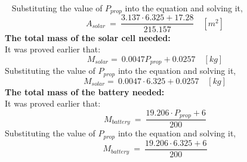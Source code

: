 \  \quad [m^2] \] Substituting the value of $ P_{prop} $ into the equation and solving it, \[ A_{solar} \ = \ \frac{ 3.137 \cdot 6.325 + 17.28 }{ 215.157 } \quad [m^2] \] \boxfour \vspace{1cm} \p \textbf{The total mass of the solar cell needed:} \vspace{0.1cm}\\ It was proved earlier that: \[ M_{solar} = \ 0.0047 P_{prop} + 0.0257  \quad [kg] \] Substituting the value of $ P_{prop} $ into the equation and solving it, \[ M_{solar} = \ 0.0047 \cdot 6.325 + 0.0257  \quad [kg] \] \boxfive \vspace{1cm} \p \textbf{The total mass of the battery needed:} \vspace{0.1cm}\\ It was proved earlier that: \[ M_{battery} \ = \ \frac{ 19.206 \cdot P_{prop} + 6 }{ 200 } \] Substituting the value of $ P_{prop} $ into the equation and solving it, \[ M_{battery} \ = \ \frac{ 19.206 \cdot 6.325 + 6 }{ 200 } \] \boxsix
